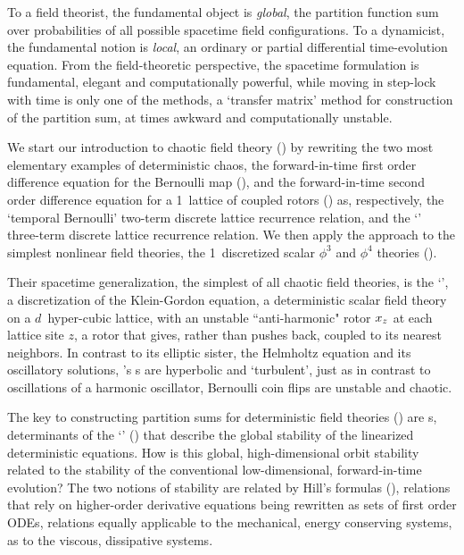 To a field theorist, the fundamental object is \emph{global}, the
partition function sum over probabilities of all possible spacetime field
configurations.
To a dynamicist, the fundamental notion is \emph{local}, an ordinary or
partial differential time-evolution equation. From the field-theoretic
perspective, the spacetime formulation is fundamental, elegant and
computationally powerful, while moving in step-lock with time is only one
of the methods, a `transfer matrix' method for construction of the
partition sum, at times awkward and computationally unstable.

We start our introduction to chaotic field theory () by
rewriting the two most elementary examples of deterministic chaos,
the for\-ward-in-time first order difference equation for the Bernoulli
map (), and
the for\-ward-in-time second order difference equation for a 1\dmn\
lattice of coupled rotors () as, respectively,
the `{temporal Bernoulli}' two-term discrete lattice recurrence relation,
and
the `\templatt'  three-term discrete lattice recurrence relation.
We then apply the approach to the simplest
nonlinear field theories, the 1\dmn\ discretized
scalar {$\phi^3$} and {$\phi^4$} theories
().

Their spacetime generalization, the simplest of all chaotic field theories,
is the `\catlatt'\rf{GutOsi15,GHJSC16,CL18}, a discretization of the
Klein-Gordon equation, a deterministic scalar field theory on a $d$\dmn\
hyper-cubic lattice, with an unstable ``anti-harmonic" rotor $x_{z}$
at each lattice site $z$, a rotor that gives, rather than pushes back,
coupled to its nearest neighbors.
In contrast to its elliptic sister, the Helmholtz equation and its
oscillatory solutions, {\catlatt}'s {\lattstate}s are hyperbolic and
`turbulent', just as in contrast to oscillations of a harmonic
oscillator, Bernoulli coin flips are unstable and chaotic.

The key to constructing partition sums for deterministic field theories
() are {\HillDet}s, determinants of  the
`{\jacobianOrbs}' (\refsect{s:JacobianOrb}) that describe the global stability of the
linearized deterministic equations.
How is this global, high-dimensional orbit stability related
to the stability of the conventional low-dimensional, forward-in-time evolution?
The two notions of stability are related by Hill's
formulas (\refsect{s:LC21Hill}), relations that rely on higher-order
derivative equations being rewritten as sets of first order ODEs,
relations equally applicable to the mechanical, energy conserving
systems, as to the viscous, dissipative systems.

